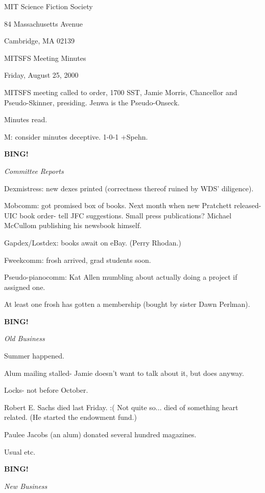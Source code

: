 \documentclass[12pt]{article}
\newcommand{\bing}{{\bf BING!} }
\newcommand{\goto}[1]{\bing \vskip 12pt \centerline{{\em{#1}}}}
\begin{document}
\begin{center}

MIT Science Fiction Society 

84 Massachusetts Avenue

Cambridge, MA 02139

\vspace{12pt}

MITSFS Meeting Minutes 

Friday, August 25, 2000

\end{center}
 
\vspace{18pt}

\setlength{\parskip}{6pt}

\noindent
MITSFS meeting called to order, 1700 SST, Jamie Morris, Chancellor and Pseudo-Skinner, presiding.  Jenwa is the Pseudo-Onseck.

Minutes read.

M: consider minutes deceptive. 1-0-1 +Spehn.

\goto{Committee Reports}

Dexmistress: new dexes printed (correctness thereof ruined by WDS' diligence).

Mobcomm: got promised box of books. Next month when new Pratchett released- UIC book order- tell JFC suggestions. Small press publications? Michael McCullom publishing his newsbook himself.

Gapdex/Lostdex: books await on eBay. (Perry Rhodan.)

Fweekcomm: frosh arrived, grad students soon.

Pseudo-pianocomm: Kat Allen mumbling about actually doing a project if assigned one.

At least one frosh has gotten a membership (bought by sister Dawn Perlman).

\goto{Old Business}

Summer happened.

Alum mailing stalled- Jamie doesn't want to talk about it, but does anyway.

Locks- not before October.

Robert E. Sachs died last Friday. :( Not quite so... died of something heart related. (He started the endowment fund.)

Paulee Jacobs (an alum) donated several hundred magazines.

Usual etc.

\goto{New Business}
\end{document}
